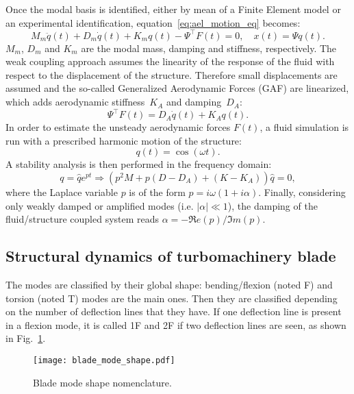 Once the modal basis
is identified, either by mean of a Finite
Element model or an experimental identification, 
equation~\ref{eq:ael_motion_eq} becomes:
\begin{equation}
  \label{eq:2}
  M_m \ddot{q}(t) + D_m \dot{q}(t) + K_m q (t) - \Psi^\top F(t)=0, \quad x(t) = \Psi q(t).
\end{equation}
$M_m$, $D_m$ and $K_m$ are the modal mass, 
damping and stiffness, respectively.
The weak coupling approach assumes the linearity of the response of
the fluid with respect to the displacement of the structure. Therefore
small displacements are assumed and the so-called Generalized
Aerodynamic Forces (GAF) are linearized, which adds aerodynamic
stiffness~$K_A$ and damping~$D_A$:
\begin{equation}
  \label{eq:4}
  \Psi^\top F(t) = D_A\dot{q}(t) + K_A q(t).
\end{equation}
In order to estimate the unsteady aerodynamic forces $F(t)$, 
a fluid simulation is run with a prescribed harmonic motion of the
structure:
\begin{equation}
  \label{eq:6}
  q(t)=\cos(\omega t).
\end{equation}
A stability analysis is then performed in the frequency domain:
\begin{equation}
  \label{eq:5}
  q=\hat{q}e^{p t}\Rightarrow\left(
    p^2M + p(D-D_A) + (K-K_A)
  \right)\hat{q}=0,
\end{equation}
where the Laplace variable $p$ is of the form
$p=i\omega(1+i\alpha)$. Finally, considering only weakly damped or
amplified modes (i.e. $|\alpha| \ll 1$), the damping of the
fluid/structure coupled system reads $\alpha=-\Re e(p)/\Im m(p)$.

\subsection{Structural dynamics of turbomachinery blade}
\label{sub:structural_dynamics_of_turbomachinery_blade}

The modes are classified by their global shape: 
bending/flexion (noted F) and torsion (noted T) 
modes are the main ones. Then they are classified
depending on the number of deflection lines that they
have. If one deflection line is present in a flexion 
mode, it is called 1F and 2F if two deflection lines are
seen, as shown in Fig.~\ref{fig:blade_mode_shape}.
\begin{figure}[htbp]
  \centering
  \texttt{[image: blade\_mode\_shape.pdf]}
  \caption{Blade mode shape nomenclature.}
  \label{fig:blade_mode_shape}
\end{figure}


